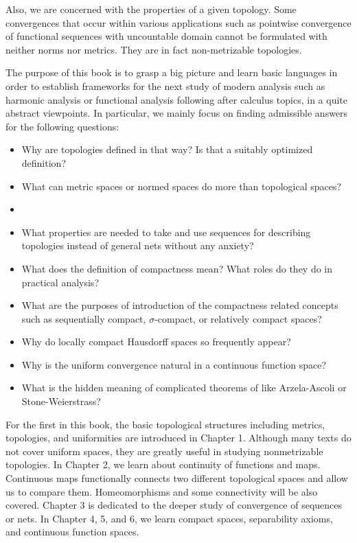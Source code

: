Also, we are concerned with the properties of a given topology.
Some convergences that occur within various applications such as pointwise convergence of functional sequences with uncountable domain cannot be formulated with neither norms nor metrics.
They are in fact non-metrizable topologies.
\fi




The purpose of this book is to grasp a big picture and learn basic languages in order to establish frameworks for the next study of modern analysis such as harmonic analysis or functional analysis following after calculus topics, in a quite abstract viewpoints.
In particular, we mainly focus on finding admissible answers for the following questions:
\begin{itemize}
\item Why are topologies defined in that way? Is that a suitably optimized definition?
\item What can metric spaces or normed spaces do more than topological spaces?
\item 
\item What properties are needed to take and use sequences for describing topologies instead of general nets without any anxiety? 
\item What does the definition of compactness mean? What roles do they do in practical analysis?
\item What are the purposes of introduction of the compactness related concepts such as sequentially compact, $\sigma$-compact, or relatively compact spaces?
\item Why do locally compact Hausdorff spaces so frequently appear?
\item Why is the uniform convergence natural in a continuous function space?
\item What is the hidden meaning of complicated theorems of like Arzela-Ascoli or Stone-Weierstrass?
\end{itemize}
For the first in this book, the basic topological structures including metrics, topologies, and uniformities are introduced in Chapter 1.
Although many texts do not cover uniform spaces, they are greatly useful in studying nonmetrizable topologies.
In Chapter 2, we learn about continuity of functions and maps.
Continuous maps functionally connects two different topological spaces and allow us to compare them.
Homeomorphisms and some connectivity will be also covered.
Chapter 3 is dedicated to the deeper study of convergence of sequences or nets.
In Chapter 4, 5, and 6, we learn compact spaces, separability axioms, and continuous function spaces.

